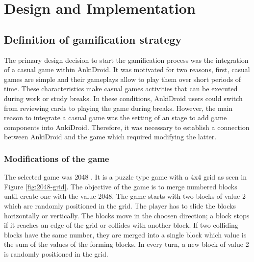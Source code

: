 
\chapter{Design and Implementation} %

\label{desi} %


\section{Definition of gamification strategy}
\label{desi-gamification-strategy}

The primary design decision to start the gamification process was the integration of a casual game within AnkiDroid. It was motivated for two reasons, first, casual games are simple and their gameplays allow to play them over short periods of time. These characteristics make casual games activities that can be executed during work or study breaks. In these conditions, AnkiDroid users could switch from reviewing cards to playing the game during breaks. However, the main reason to integrate a casual game was the setting of an stage to add game components into AnkiDroid. Therefore, it was necessary to establish a connection between AnkiDroid and the game which required modifying the latter.

\subsection{Modifications of the game}
The selected game was 2048 \citep{uberspot2017game}. It is a puzzle type game with a 4x4 grid as seen in Figure \ref{fig:2048-grid}. The objective of the game is to merge numbered blocks until create one with the value 2048. The game starts with two blocks of value 2 which are randomly positioned in the grid. The player has to slide the blocks horizontally or vertically. The blocks move in the choosen direction; a block stops if it reaches an edge of the grid or collides with another block. If two colliding blocks have the same number, they are merged into a single block which value is the sum of the values of the forming blocks. In every turn, a new block of value 2 is randomly positioned in the grid.

